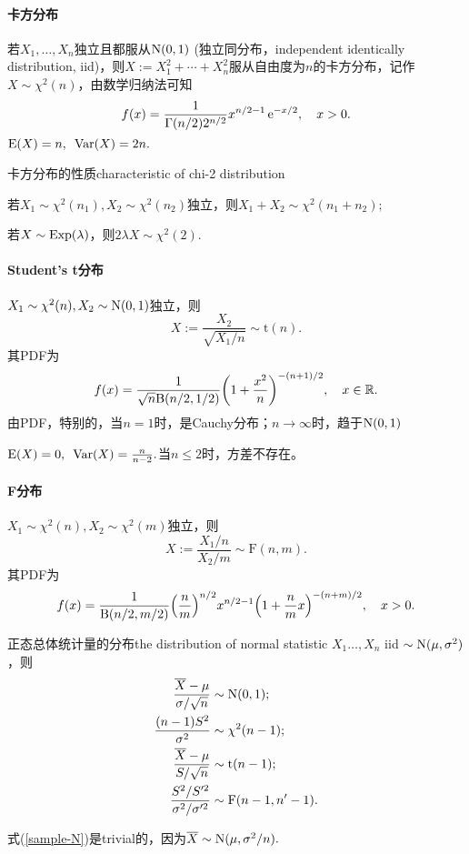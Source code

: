 \paragraph{卡方分布}若$X_1,\ldots,X_n$独立且都服从$\operatorname{N}(0,1)$ (独立同分布，independent identically distribution, iid)，则$X:=X_1^2+\cdots+X_n^2$服从自由度为$n$的卡方分布，记作$X\sim\chi^2(n)$，由数学归纳法可知
\begin{align}
	f(x)=\frac1{\Gamma(n/2)2^{n/2}}x^{n/2-1}\mathop{}\!\mathrm{e}^{-x/2},\quad x>0.
\end{align}
$\operatorname{E}(X)=n,\enspace\operatorname{Var}(X)=2n.$
\begin{theorem}{卡方分布的性质}{characteristic of chi-2 distribution}
	\begin{compactenum}
		\item 若$X_1\sim\chi^2(n_1),X_2\sim\chi^2(n_2)$独立，则$X_1+X_2\sim\chi^2(n_1+n_2);$
		\item 若$X\sim\operatorname{Exp}(\lambda)$，则$2\lambda X\sim\chi^2(2).$
	\end{compactenum}
\end{theorem}
\paragraph{Student's t分布}$X_1\sim\chi^2(n),X_2\sim\operatorname{N}(0,1)$独立，则
\[
	X:=\frac{X_2}{\sqrt{X_1/n}}\sim\mathrm t(n).
\]
其PDF为
\begin{align}
	f(x)=\frac1{\sqrt n\mathrm B(n/2,1/2)}\biggl(1+\frac{x^2}n\biggr)^{-(n+1)/2},\quad x\in\mathbb R.
\end{align}
由PDF，特别的，当$n=1$时，是Cauchy分布；$n\to\infty$时，趋于$\operatorname{N}(0,1)$

$\operatorname{E}(X)=0,\enspace\operatorname{Var}(X)=\frac{n}{n-2}.$当$n\leqslant 2$时，方差不存在。
\paragraph{F分布}$X_1\sim\chi^2(n),X_2\sim\chi^2(m)$独立，则 
\[
	X:=\frac{X_1/n}{X_2/m}\sim\mathrm F(n,m).
\]
其PDF为
\begin{align}
	f(x)=\frac1{\mathrm B(n/2,m/2)}\Bigl(\frac nm\Bigr)^{n/2}x^{n/2-1}\Bigl(1+\frac nmx\Bigr)^{-(n+m)/2},\quad x>0.
\end{align}
\begin{theorem}{正态总体统计量的分布}{the distribution of normal statistic}
	$X_1\ldots,X_n$ iid $\sim\operatorname{N}(\mu,\sigma^2)$，则
	\begin{align}
		\label{sample-N}
		\frac{\overline X-\mu}{\sigma/\sqrt n}&\sim\operatorname{N}(0,1);\\
		\label{sample-chi2}
		\frac{(n-1)S^2}{\sigma^2}&\sim\chi^2(n-1);\\
		\label{sample-t}
		\frac{\overline X-\mu}{S/\sqrt n}&\sim\mathrm t(n-1);\\
		\label{2sample-F}
		\frac{S^2/S'^2}{\sigma^2/\sigma'^2}&\sim\mathrm F(n-1,n'-1).
	\end{align}
\end{theorem}
\prf 式(\ref{sample-N})是trivial的，因为$\overline X\sim\operatorname{N}(\mu,\sigma^2/n).$


